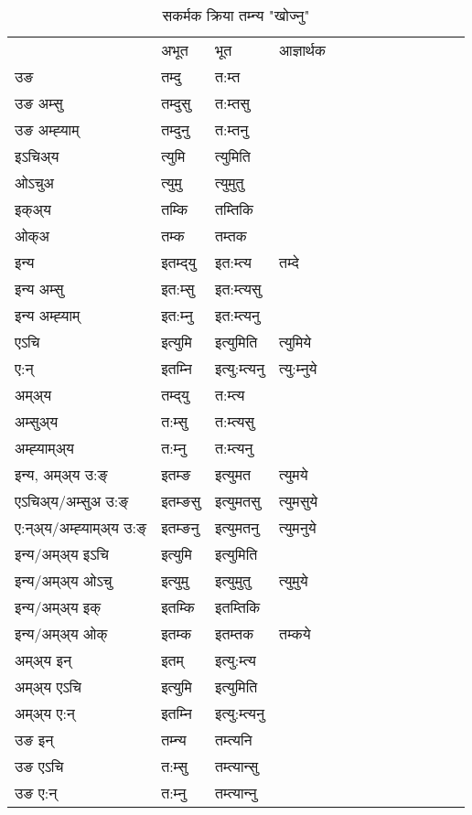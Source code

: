 \begin{table}[H]
\label{umt.vt} \centering
\caption{सकर्मक क्रिया  तम्‍न्य  "खोज्नु"  }
\begin{tabular}{l|l|l|l|l|l|l|l|l|l|l|l|l}  \toprule
&अभूत & भूत & आज्ञार्थक \\ 
उङ &तम्दु &त:म्त \\ 
उङ अम्सु&तम्दुसु &त:म्तसु \\ 
उङ अम्ह्‍याम्&तम्दुनु &त:म्तनु \\ 
इऽचिअ्य &त्युमि &त्युमिति   \\ 
ओऽचुअ        &त्युमु &त्युमुतु   \\ 
इक्अ्य&तम्कि &तम्तिकि   \\ 
ओक्अ &तम्क &तम्तक   \\ 
इन्य & इतम्द्‌यु  & इत:म्त्य &तम्दे  \\ 
इन्य अम्सु& इत:म्सु  & इत:म्त्यसु   \\ 
इन्य अम्ह्‍याम्& इत:म्‍नु  & इत:म्त्यनु   \\ 
एऽचि & इत्युमि & इत्युमिति &त्युमिये    \\ 
ए:न् & इतम्‍नि  & इत्यु:म्त्यनु &त्यु:म्‍नुये  \\ 
अम्अ्य & तम्द्‌यु  & त:म्त्य  \\ 
अम्सुअ्य & त:म्सु & त:म्त्यसु  \\ 
अम्ह्‍याम्अ्य & त:म्‍नु  & त:म्त्यनु \\ 
\midrule
इन्य, अम्अ्य उ:ङ्‌ &इतम्ङ &इत्युमत &त्युमये \\ 
एऽचिअ्य/अम्सुअ उ:ङ्‌ &इतम्ङसु &इत्युमतसु &त्युमसुये \\ 
ए:न्अ्य/अम्ह्‍याम्अ्य उ:ङ्‌ &इतम्ङनु &इत्युमतनु &त्युमनुये \\ 
इन्य/अम्अ्य इऽचि &इत्युमि &इत्युमिति    \\ 
इन्य/अम्अ्य ओऽचु &इत्युमु &इत्युमुतु  &त्युमुये  \\ 
इन्य/अम्अ्य इक् &इतम्कि &इतम्तिकि   \\ 
इन्य/अम्अ्य ओक् &इतम्क &इतम्तक  &तम्कये  \\ 
अम्अ्य इन् & इतम् & इत्यु:म्त्य   \\ 
अम्अ्य एऽचि & इत्युमि & इत्युमिति    \\ 
अम्अ्य ए:न् & इतम्‍नि  & इत्यु:म्त्यनु  \\ 
\midrule
उङ इन् & तम्‍न्य  & तम्त्यनि  \\ 
उङ एऽचि & त:म्सु  & तम्त्यान्सु   \\ 
उङ ए:न्& त:म्‍नु  & तम्त्यान्‍नु   \\ 
\bottomrule
\end{tabular}
\end{table}


